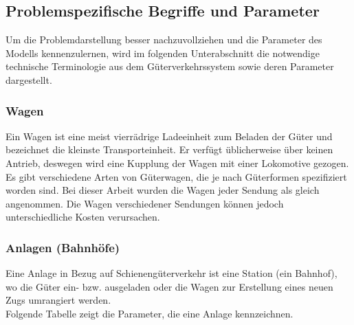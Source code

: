 \subsection{Problemspezifische Begriffe und Parameter}
Um die Problemdarstellung besser nachzuvollziehen und die Parameter des Modells kennenzulernen, wird im folgenden Unterabschnitt die notwendige technische Terminologie aus dem Güterverkehrssystem sowie deren Parameter dargestellt.

\subsubsection{Wagen}
Ein Wagen ist eine meist vierrädrige Ladeeinheit zum Beladen der Güter und bezeichnet die kleinste Transporteinheit. Er verfügt üblicherweise über keinen Antrieb, deswegen wird eine Kupplung der Wagen mit einer Lokomotive gezogen. Es gibt verschiedene Arten von Güterwagen, die je nach Güterformen spezifiziert worden sind. Bei dieser Arbeit wurden die Wagen jeder Sendung als gleich angenommen. Die Wagen verschiedener Sendungen können jedoch unterschiedliche Kosten verursachen.

\subsubsection{Anlagen (Bahnhöfe)}
Eine Anlage in Bezug auf Schienengüterverkehr ist eine Station (ein Bahnhof), wo die Güter ein- bzw. ausgeladen oder die Wagen zur Erstellung eines neuen Zugs umrangiert werden.\\
Folgende Tabelle zeigt die Parameter, die eine Anlage kennzeichnen.

